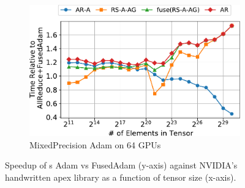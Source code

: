 \begin{figure}
\begin{subfigure}{0.66\columnwidth}
    \includegraphics[width=\columnwidth]{figures/results-adamfp16-64-gpus.pdf} 
    \caption{MixedPrecision Adam on 64 GPUs} 
  \end{subfigure}
  \caption{Speedup of \tool s Adam vs FusedAdam (y-axis) against
    NVIDIA's handwritten apex library as a function of tensor size
    (x-axis).  \label{fig:dslvsfusedadam}}
\end{figure}

